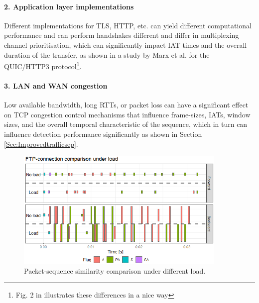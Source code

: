 \documentclass[runningheads]{llncs}
\begin{document}


\paragraph{2. Application layer implementations}
Different implementations for TLS, HTTP, etc. can yield different computational performance and can perform handshakes different and differ in multiplexing channel prioritisation, which can significantly impact IAT times and the overall duration of the transfer, as shown in a study by Marx et al. \cite{marx2020same} for the QUIC/HTTP3 protocol\footnote{Fig. 2 in \cite{marx2020same} illustrates these differences in a nice way}. 


\paragraph{3. LAN and WAN congestion}
Low available bandwidth, long RTTs, or packet loss can have a significant effect on TCP congestion control mechanisms that influence frame-sizes, IATs, window sizes, and the overall temporal characteristic of the sequence, which in turn can influence detection performance significantly as shown in Section \ref{Sec:Improvedtrafficsep}.


\begin{figure}
\centering
\includegraphics[width=0.9\textwidth]{images/FTP_load.png}
\caption{Packet-sequence similarity comparison under different load.} %
\label{Fig:FTP_load}
\end{figure}
\end{document}
